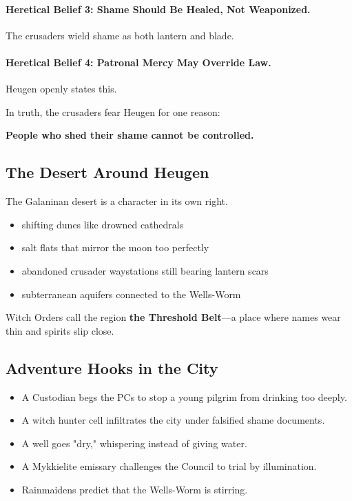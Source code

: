 \documentclass[11pt]{book}
\begin{document}
\paragraph{Heretical Belief 3: Shame Should Be Healed, Not Weaponized.}  
The crusaders wield shame as both lantern and blade.

\paragraph{Heretical Belief 4: Patronal Mercy May Override Law.}  
Heugen openly states this.

\medskip

In truth, the crusaders fear Heugen for one reason:  
\begin{center}
\textbf{People who shed their shame cannot be controlled.}
\end{center}

\subsection{The Desert Around Heugen}

The Galaninan desert is a character in its own right.

\begin{itemize}[leftmargin=*]
    \item shifting dunes like drowned cathedrals  
    \item salt flats that mirror the moon too perfectly  
    \item abandoned crusader waystations still bearing lantern scars  
    \item subterranean aquifers connected to the Wells-Worm  
\end{itemize}

Witch Orders call the region \textbf{the Threshold Belt}---a place where names wear thin and spirits slip close.

\subsection{Adventure Hooks in the City}
\begin{itemize}[leftmargin=*]
    \item A Custodian begs the PCs to stop a young pilgrim from drinking too deeply.  
    \item A witch hunter cell infiltrates the city under falsified shame documents.  
    \item A well goes "dry," whispering instead of giving water.  
    \item A Mykkielite emissary challenges the Council to trial by illumination.  
    \item Rainmaidens predict that the Wells-Worm is stirring.  
\end{itemize}
\end{document}
